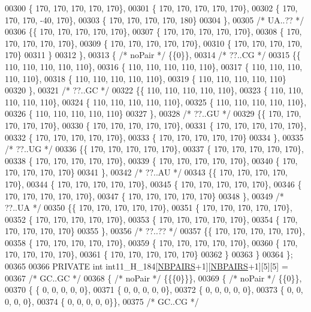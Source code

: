 \begin{DoxyCode}
00300 \{ 170, 170, 170, 170, 170\},
00301 \{ 170, 170, 170, 170, 170\},
00302 \{ 170, 170, 170, -40, 170\},
00303 \{ 170, 170, 170, 170, 180\}
00304 \},
00305 \textcolor{comment}{/* UA..?? */}
00306 \{\{ 170, 170, 170, 170, 170\},
00307 \{ 170, 170, 170, 170, 170\},
00308 \{ 170, 170, 170, 170, 170\},
00309 \{ 170, 170, 170, 170, 170\},
00310 \{ 170, 170, 170, 170, 170\}
00311 \}
00312 \},
00313 \{ \textcolor{comment}{/* noPair */} \{\{0\}\},
00314 \textcolor{comment}{/* ??..CG */}
00315 \{\{ 110, 110, 110, 110, 110\},
00316 \{ 110, 110, 110, 110, 110\},
00317 \{ 110, 110, 110, 110, 110\},
00318 \{ 110, 110, 110, 110, 110\},
00319 \{ 110, 110, 110, 110, 110\}
00320 \},
00321 \textcolor{comment}{/* ??..GC */}
00322 \{\{ 110, 110, 110, 110, 110\},
00323 \{ 110, 110, 110, 110, 110\},
00324 \{ 110, 110, 110, 110, 110\},
00325 \{ 110, 110, 110, 110, 110\},
00326 \{ 110, 110, 110, 110, 110\}
00327 \},
00328 \textcolor{comment}{/* ??..GU */}
00329 \{\{ 170, 170, 170, 170, 170\},
00330 \{ 170, 170, 170, 170, 170\},
00331 \{ 170, 170, 170, 170, 170\},
00332 \{ 170, 170, 170, 170, 170\},
00333 \{ 170, 170, 170, 170, 170\}
00334 \},
00335 \textcolor{comment}{/* ??..UG */}
00336 \{\{ 170, 170, 170, 170, 170\},
00337 \{ 170, 170, 170, 170, 170\},
00338 \{ 170, 170, 170, 170, 170\},
00339 \{ 170, 170, 170, 170, 170\},
00340 \{ 170, 170, 170, 170, 170\}
00341 \},
00342 \textcolor{comment}{/* ??..AU */}
00343 \{\{ 170, 170, 170, 170, 170\},
00344 \{ 170, 170, 170, 170, 170\},
00345 \{ 170, 170, 170, 170, 170\},
00346 \{ 170, 170, 170, 170, 170\},
00347 \{ 170, 170, 170, 170, 170\}
00348 \},
00349 \textcolor{comment}{/* ??..UA */}
00350 \{\{ 170, 170, 170, 170, 170\},
00351 \{ 170, 170, 170, 170, 170\},
00352 \{ 170, 170, 170, 170, 170\},
00353 \{ 170, 170, 170, 170, 170\},
00354 \{ 170, 170, 170, 170, 170\}
00355 \},
00356 \textcolor{comment}{/* ??..?? */}
00357 \{\{ 170, 170, 170, 170, 170\},
00358 \{ 170, 170, 170, 170, 170\},
00359 \{ 170, 170, 170, 170, 170\},
00360 \{ 170, 170, 170, 170, 170\},
00361 \{ 170, 170, 170, 170, 170\}
00362 \}
00363 \}
00364 \};
00365 
00366 PRIVATE \textcolor{keywordtype}{int} int11\_H\_184[\hyperlink{energy__const_8h_a5e75221c779d618eab81e096f37e32ce}{NBPAIRS}+1][\hyperlink{energy__const_8h_a5e75221c779d618eab81e096f37e32ce}{NBPAIRS}+1][5][5] =
00367  \textcolor{comment}{/* GC..GC */}
00368 \{ \textcolor{comment}{/* noPair */} \{\{\{0\}\}\},
00369 \{ \textcolor{comment}{/* noPair */} \{\{0\}\},
00370 \{ \{  0, 0, 0, 0, 0\},
00371 \{  0, 0, 0, 0, 0\},
00372 \{  0, 0, 0, 0, 0\},
00373 \{  0, 0, 0, 0, 0\},
00374 \{  0, 0, 0, 0, 0\}\},
00375  \textcolor{comment}{/* GC..CG */}

\end{DoxyCode}

